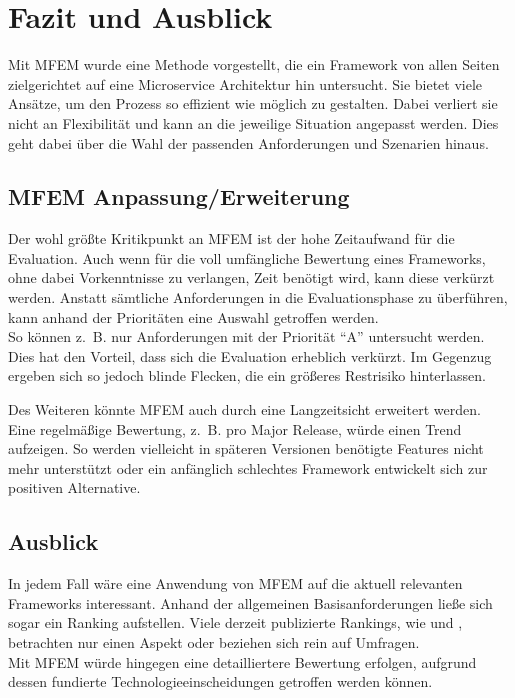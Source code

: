 \section{Fazit und Ausblick}

Mit \ac{MFEM} wurde eine Methode vorgestellt, die ein Framework von allen Seiten zielgerichtet auf eine Microservice Architektur hin untersucht. Sie bietet viele Ansätze, um den Prozess so effizient wie möglich zu gestalten. Dabei verliert sie nicht an Flexibilität und kann an die jeweilige Situation angepasst werden. Dies geht dabei über die Wahl der passenden Anforderungen und Szenarien hinaus.

\subsection{\ac*{MFEM} Anpassung/Erweiterung}

Der wohl größte Kritikpunkt an \ac{MFEM} ist der hohe Zeitaufwand für die Evaluation. Auch wenn für die voll umfängliche Bewertung eines Frameworks, ohne dabei Vorkenntnisse zu verlangen, Zeit benötigt wird, kann diese verkürzt werden. Anstatt sämtliche Anforderungen in die Evaluationsphase zu überführen, kann anhand der Prioritäten eine Auswahl getroffen werden.\\
So können z.~B. nur Anforderungen mit der Priorität \enquote{A} untersucht werden. Dies hat den Vorteil, dass sich die Evaluation erheblich verkürzt. Im Gegenzug ergeben sich so jedoch blinde Flecken, die ein größeres Restrisiko hinterlassen.
 
Des Weiteren könnte \ac{MFEM} auch durch eine Langzeitsicht erweitert werden. Eine regelmäßige Bewertung, z.~B. pro Major Release, würde einen Trend aufzeigen. So werden vielleicht in späteren Versionen benötigte Features nicht mehr unterstützt oder ein anfänglich schlechtes Framework entwickelt sich zur positiven Alternative.

\subsection{Ausblick}

In jedem Fall wäre eine Anwendung von \ac{MFEM} auf die aktuell relevanten Frameworks interessant. Anhand der allgemeinen Basisanforderungen ließe sich sogar ein Ranking aufstellen. Viele derzeit publizierte Rankings, wie \cite{JaxFrameTrend2017} und \cite{HotFramework2017}, betrachten nur einen Aspekt oder beziehen sich rein auf Umfragen.\\ 
Mit \ac{MFEM} würde hingegen eine detailliertere Bewertung erfolgen, aufgrund dessen fundierte Technologieeinscheidungen getroffen werden können.